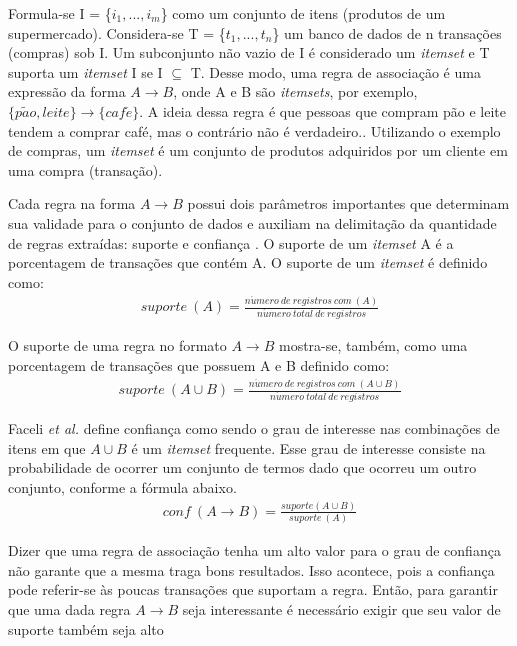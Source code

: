 \documentclass[tg]{mdtufsm}
\begin{document}
Formula-se I = \{$i_1, ... ,i_m$\} como um conjunto de itens (produtos de um supermercado). Considera-se T = \{$t_1, ... ,t_n$\} um banco de dados de n transações (compras) sob I. Um subconjunto não vazio de I é considerado um \textit{itemset} e T suporta um \textit{itemset} I se I $\subseteq$ T. Desse modo, uma regra de associação é uma expressão da forma $A \rightarrow B$, onde A e B são \textit{itemsets}, por exemplo, $\{p\tilde{a}o, leite\} \rightarrow \{caf\acute{e}\}$. A ideia dessa regra é que pessoas que compram pão e leite tendem a comprar café, mas o contrário não é verdadeiro.\cite{amo2003}. Utilizando o exemplo de compras, um \textit{itemset} é um conjunto de produtos adquiridos por um cliente em uma compra (transação).

Cada regra na forma $A \rightarrow B$ possui dois parâmetros importantes que determinam sua validade para o conjunto de dados e auxiliam na delimitação da quantidade de regras extraídas: suporte e confiança \cite{gon}. O suporte de um \textit{itemset} A é a porcentagem de transações que contém A. O suporte de um \textit{itemset} é definido como:
\begin{gather*} 
suporte\ (A) = \frac{n\acute{u}mero\ de\ registros\ com\ (A)}{n\acute{u}mero\ total\ de\ registros}
\end{gather*}

O suporte de uma regra no formato $A \rightarrow B$ mostra-se, também, como uma porcentagem de transações que possuem A e B definido como:
\begin{gather*} 
suporte\ (A \cup B) = \frac{n\acute{u}mero\ de\ registros\ com\ (A \cup B)}{n\acute{u}mero\ total\ de\ registros}
\end{gather*}

Faceli \textit{et al.} \citeyearpar{faceli} define confiança como sendo o grau de interesse nas combinações de itens em que $A \cup B$ é um \textit{itemset} frequente. Esse grau de interesse consiste na probabilidade de ocorrer um conjunto de termos dado que ocorreu um outro conjunto, conforme a fórmula abaixo.
\begin{gather*} 
conf\ (A \rightarrow B) = \frac{suporte (A \cup B)}{suporte\ (A)}
\end{gather*} 

Dizer que uma regra de associação tenha um alto valor para o grau de confiança não garante que a mesma traga bons resultados. Isso acontece, pois a confiança pode referir-se às poucas transações que suportam a regra. Então, para garantir que uma dada regra $A \rightarrow B$ seja interessante é necessário exigir que seu valor de suporte também seja alto \cite{amo2003}
\end{document}
